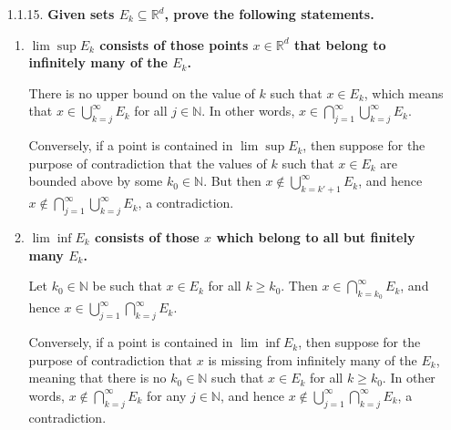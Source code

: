 \documentclass[a4paper,12pt]{article}
\begin{document}
\begin{enumerate}
    \item[1.1.15.]
        \boldmath\textbf{Given sets $E_k \subseteq \mathbb{R}^d$, prove the following statements.
        }\unboldmath
        \begin{enumerate}
            \item
                \boldmath\textbf{$\lim\sup E_k$ consists of those points $x \in \mathbb{R}^d$ that belong to infinitely many of the $E_k$.
                }\unboldmath \par
                There is no upper bound on the value of $k$ such that $x \in E_k$, which means that $x \in \bigcup_{k = j}^\infty E_k$ for all $j \in \mathbb{N}$. In other words, $x \in \bigcap_{j = 1}^\infty \bigcup_{k = j}^\infty E_k$. \par
                Conversely, if a point is contained in $\lim\sup E_k$, then suppose for the purpose of contradiction that the values of $k$ such that $x \in E_k$ are bounded above by some $k_0 \in \mathbb{N}$. But then $x \notin \bigcup_{k = k' + 1}^\infty E_k$, and hence $x \notin \bigcap_{j = 1}^\infty \bigcup_{k = j}^\infty E_k$, a contradiction.
            \item
                \boldmath\textbf{$\lim\inf E_k$ consists of those $x$ which belong to all but finitely many $E_k$.
                }\unboldmath \par
                Let $k_0 \in \mathbb{N}$ be such that $x \in E_k$ for all $k \geq k_0$. Then $x \in \bigcap_{k = k_0}^\infty E_k$, and hence $x \in \bigcup_{j = 1}^\infty \bigcap_{k = j}^\infty E_k$. \par
                Conversely, if a point is contained in $\lim\inf E_k$, then suppose for the purpose of contradiction that $x$ is missing from infinitely many of the $E_k$, meaning that there is no $k_0 \in \mathbb{N}$ such that $x \in E_k$ for all $k \geq k_0$. In other words, $x \notin \bigcap_{k = j}^\infty E_k$ for any $j \in \mathbb{N}$, and hence $x \notin \bigcup_{j = 1}^\infty \bigcap_{k = j}^\infty E_k$, a contradiction.
        \end{enumerate}


\end{enumerate}
\end{document}
